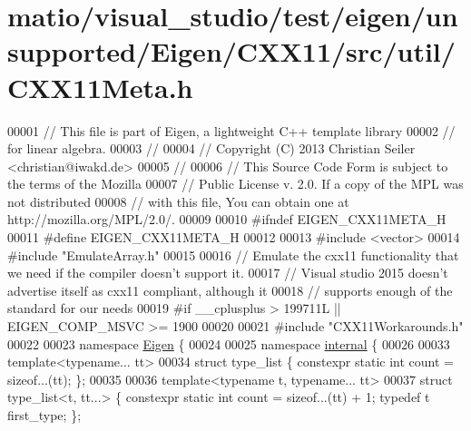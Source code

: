 \hypertarget{matio_2visual__studio_2test_2eigen_2unsupported_2_eigen_2_c_x_x11_2src_2util_2_c_x_x11_meta_8h_source}{}\section{matio/visual\+\_\+studio/test/eigen/unsupported/\+Eigen/\+C\+X\+X11/src/util/\+C\+X\+X11\+Meta.h}
\label{matio_2visual__studio_2test_2eigen_2unsupported_2_eigen_2_c_x_x11_2src_2util_2_c_x_x11_meta_8h_source}

\begin{DoxyCode}
00001 \textcolor{comment}{// This file is part of Eigen, a lightweight C++ template library}
00002 \textcolor{comment}{// for linear algebra.}
00003 \textcolor{comment}{//}
00004 \textcolor{comment}{// Copyright (C) 2013 Christian Seiler <christian@iwakd.de>}
00005 \textcolor{comment}{//}
00006 \textcolor{comment}{// This Source Code Form is subject to the terms of the Mozilla}
00007 \textcolor{comment}{// Public License v. 2.0. If a copy of the MPL was not distributed}
00008 \textcolor{comment}{// with this file, You can obtain one at http://mozilla.org/MPL/2.0/.}
00009 
00010 \textcolor{preprocessor}{#ifndef EIGEN\_CXX11META\_H}
00011 \textcolor{preprocessor}{#define EIGEN\_CXX11META\_H}
00012 
00013 \textcolor{preprocessor}{#include <vector>}
00014 \textcolor{preprocessor}{#include "EmulateArray.h"}
00015 
00016 \textcolor{comment}{// Emulate the cxx11 functionality that we need if the compiler doesn't support it.}
00017 \textcolor{comment}{// Visual studio 2015 doesn't advertise itself as cxx11 compliant, although it}
00018 \textcolor{comment}{// supports enough of the standard for our needs}
00019 \textcolor{preprocessor}{#if \_\_cplusplus > 199711L || EIGEN\_COMP\_MSVC >= 1900}
00020 
00021 \textcolor{preprocessor}{#include "CXX11Workarounds.h"}
00022 
00023 \textcolor{keyword}{namespace }\hyperlink{namespace_eigen}{Eigen} \{
00024 
00025 \textcolor{keyword}{namespace }\hyperlink{namespaceinternal}{internal} \{
00026 
00033 \textcolor{keyword}{template}<\textcolor{keyword}{typename}... tt>
00034 \textcolor{keyword}{struct }type\_list \{ constexpr \textcolor{keyword}{static} \textcolor{keywordtype}{int} count = \textcolor{keyword}{sizeof}...(tt); \};
00035 
00036 \textcolor{keyword}{template}<\textcolor{keyword}{typename} t, \textcolor{keyword}{typename}... tt>
00037 \textcolor{keyword}{struct }type\_list<t, tt...> \{ constexpr \textcolor{keyword}{static} \textcolor{keywordtype}{int} count = \textcolor{keyword}{sizeof}...(tt) + 1; \textcolor{keyword}{typedef} t first\_type; \};

\end{DoxyCode}

